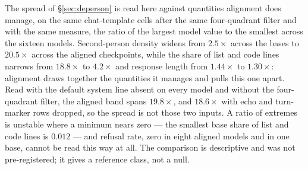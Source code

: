 The spread of \S\ref{sec:deperson} is read here against quantities alignment does manage, on the same chat-template cells after the same four-quadrant filter and with the same measure, the ratio of the largest model value to the smallest across the sixteen models. Second-person density widens from $2.5\times$ across the bases to $20.5\times$ across the aligned checkpoints, while the share of list and code lines narrows from $18.8\times$ to $4.2\times$ and response length from $1.44\times$ to $1.30\times$: alignment draws together the quantities it manages and pulls this one apart. Read with the default system line absent on every model and without the four-quadrant filter, the aligned band spans $19.8\times$, and $18.6\times$ with echo and turn-marker rows dropped, so the spread is not those two inputs. A ratio of extremes is unstable where a minimum nears zero --- the smallest base share of list and code lines is $0.012$ --- and refusal rate, zero in eight aligned models and in one base, cannot be read this way at all. The comparison is descriptive and was not pre-registered; it gives a reference class, not a null.

